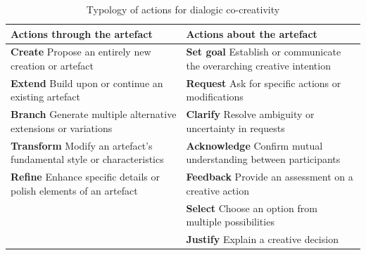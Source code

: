 \begin{table}[h]
\centering
\small
\renewcommand{\arraystretch}{1.5}
\begin{tabular}{|p{}|p{}|}
\hline
\textbf{Actions through the artefact} & \textbf{Actions about the artefact} \\ \hline

\textbf{Create} \newline Propose an entirely new creation or artefact 
& \textbf{Set goal} \newline Establish or communicate the overarching creative intention \\ \hline

\textbf{Extend} \newline Build upon or continue an existing artefact 
& \textbf{Request} \newline Ask for specific actions or modifications \\ \hline

\textbf{Branch} \newline Generate multiple alternative extensions or variations 
& \textbf{Clarify} \newline Resolve ambiguity or uncertainty in requests \\ \hline

\textbf{Transform} \newline Modify an artefact's fundamental style or characteristics 
& \textbf{Acknowledge} \newline Confirm mutual understanding between participants \\ \hline

\textbf{Refine} \newline Enhance specific details or polish elements of an artefact 
& \textbf{Feedback} \newline Provide an assessment on a creative action \\ \hline

& \textbf{Select} \newline Choose an option from multiple possibilities \\ \hline

& \textbf{Justify} \newline Explain a creative decision \\ \hline

\end{tabular}
\caption{Typology of actions for dialogic co-creativity}
\label{tab:actions_typology}
\end{table}


